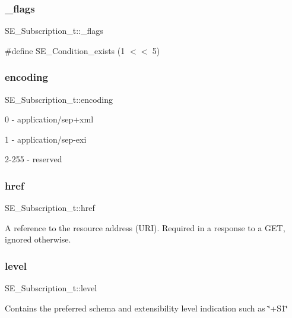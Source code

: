 \subsubsection{\texorpdfstring{\+\_\+flags}{\_flags}}
{\footnotesize\ttfamily S\+E\+\_\+\+Subscription\+\_\+t\+::\+\_\+flags}

\#define S\+E\+\_\+\+Condition\+\_\+exists (1 $<$$<$ 5) \mbox{\label{group__Subscription_ga96241742b8da02d3964190abedf7ec22}} 
\subsubsection{\texorpdfstring{encoding}{encoding}}
{\footnotesize\ttfamily S\+E\+\_\+\+Subscription\+\_\+t\+::encoding}

0 -\/ application/sep+xml

1 -\/ application/sep-\/exi

2-\/255 -\/ reserved \mbox{\label{group__Subscription_ga68652b485c042e80274c1c8cd71c9d46}} 
\subsubsection{\texorpdfstring{href}{href}}
{\footnotesize\ttfamily S\+E\+\_\+\+Subscription\+\_\+t\+::href}

A reference to the resource address (U\+RI). Required in a response to a G\+ET, ignored otherwise. \mbox{\label{group__Subscription_gab7978f478f8d68b3c5d1a4f18b13d2ed}} 
\subsubsection{\texorpdfstring{level}{level}}
{\footnotesize\ttfamily S\+E\+\_\+\+Subscription\+\_\+t\+::level}

Contains the preferred schema and extensibility level indication such as \char`\"{}+\+S1\char`\"{} \mbox{\label{group__Subscription_ga554e08734299558c7ce58d97a8a27a8d}} 

